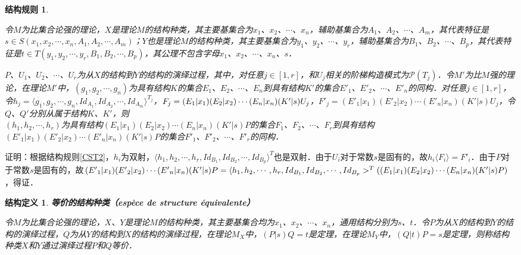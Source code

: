 \documentclass[12pt, a4paper, oneside]{book}
\newtheorem{STdef}{结构定义}
\newtheorem{CST}{结构规则}
\begin{document}
			\begin{CST}\label{CST6}
				\hfill\par
				令$M$为比集合论强的理论，$X$是理论$M$的结构种类，其主要基集合为$x_1$、$x_2$、$\cdots$、$x_n$，辅助基集合为$A_1$、$A_2$、$\cdots$、$A_m$，其代表特征是$s\in S(x_1, x_2, \cdots, x_n, A_1, A_2, \cdots, A_m)$；$Y$也是理论$M$的结构种类，其主要基集合为$y_1$、$y_2$、$\cdots$、$y_r$，辅助基集合为$B_1$、$B_2$、$\cdots$、$B_p$，其代表特征是$t\in T(y_1, y_2, \cdots, y_r, B_1, B_2, \cdots, B_p)$，其公理不包含字母$x_1$、$x_2$、$\cdots$、$x_n$、$s$．
				\par
				$P$、$U_1$、$U_2$、$\cdots$、$U_r$为从$X$的结构到$Y$的结构的演绎过程，其中，对任意$j\in [1, r]$，和$U_j$相关的阶梯构造模式为$\mathcal{P}(T_j)$．令$M'$为比$M$强的理论，在理论$M'$中，$(g_1, g_2, \cdots, g_n)$为具有结构$K$的集合$E_1$、$E_2$、$\cdots$、$E_n$到具有结构$K'$的集合${E'}_1$、${E'}_2$、$\cdots$、${E'}_n$的同构．对任意$j\in [1, r]$，令$h_j=\langle g_1, g_2, \cdots, g_n, Id_{A_1}, Id_{A_2}, \cdots, Id_{A_m}\rangle^{T_j}$，$F_j=(E_1|x_1)( E_2|x_2)\cdots(E_n|x_n)\\(K'|s)U_j$，${F'}_j=({E'}_1|x_1)({E'}_2|x_2)\cdots({E'}_n|x_n)(K'|s)U_j$，令$Q$、$Q'$分别从属于结构$K$、$K'$，则\\$(h_1, h_2, \cdots, h_r)$为具有结构$(E_1|x_1)( E_2|x_2)\cdots(E_n|x_n)(K'|s)P$的集合$F_1$、$F_2$、$\cdots$、$F_r$到具有结构$({E'}_1|x_1)({E'}_2|x_2)\cdots({E'}_n|x_n)(K'|s)P$的集合${F'}_1$、${F'}_2$、$\cdots$、${F'}_r$的同构．
			\end{CST}
			证明：根据结构规则\ref{CST2}，$h_i$为双射，$\langle h_1, h_2, \cdots, h_r, Id_{B_1}, Id_{B_2}, \cdots, Id_{B_p}\rangle^T$也是双射．由于$U_i$对于常数$s$是固有的，故$h_i\langle F_i\rangle ={F'}_i$．由于$P$对于常数$s$是固有的，故$({E'}_1|x_1)({E'}_2|x_2)\cdots\\({E'}_n|x_n)(K'|s)P =\langle h_1, h_2, \cdots, h_r, Id_{B_1}, Id_{B_2}, \cdots, Id_{B_p}>^T((E_1|x_1)( E_2|x_2)\cdots(E_n|x_n)\\(K'|s)P)$，得证．
			
			\begin{STdef}
				\textbf{等价的结构种类（espèce de structure équivalente）}
				\par
				令$M$为比集合论强的理论，$X$、$Y$是理论$M$的结构种类，其主要基集合均为$x_1$、$x_2$、$\cdots$、$x_n$，通用结构分别为$s$、$t$．令$P$为从$X$的结构到$Y$的结构的演绎过程，$Q$为从$Y$的结构到$X$的结构的演绎过程，在理论$M_X$中，$(P|s)Q=t$是定理，在理论$M_Y$中，$(Q|t)P=s$是定理，则称结构种类$X$和$Y$通过演绎过程$P$和$Q$等价．
			\end{STdef}
			
\end{document}
